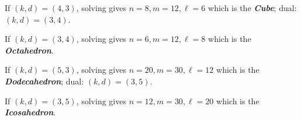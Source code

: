 If $ (k,d)=(4,3) $, solving gives $ n=8,m=12,\ell=6 $ which is
the \textbf{\emph{Cube}}; dual: $ (k,d)=(3,4) $.

If $ (k,d)=(3,4) $, solving gives $ n=6,m=12,\ell=8 $ which is
the \textbf{\emph{Octahedron}}.

If $ (k,d)=(5,3) $, solving gives $ n=20,m=30,\ell=12 $ which is
the \textbf{\emph{Dodecahedron}}; dual: $ (k,d)=(3,5) $.

If $ (k,d)=(3,5) $, solving gives $ n=12,m=30,\ell=20 $ which is
the \textbf{\emph{Icosahedron}}.
